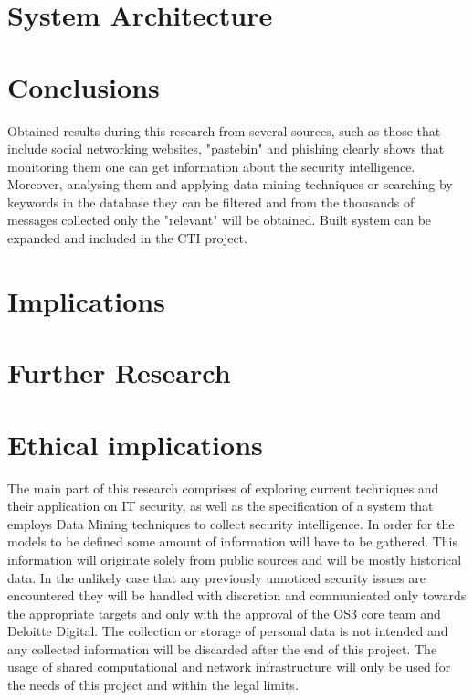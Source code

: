 \documentclass[12pt]{article}
\begin{document}
\newpage
\section{System Architecture}
\newpage
\section*{Conclusions}
Obtained results during this research from several sources, such as those that include social networking websites, "pastebin" and phishing clearly shows that monitoring them one can get information about the security intelligence. Moreover, analysing them and applying data mining techniques or searching by keywords in the database they can be filtered and from the thousands of messages collected only the "relevant" will be obtained.  Built system can be expanded and included in the CTI project.
\newpage
\section*{Implications}
\newpage
\section*{Further Research}
\newpage
\section*{Ethical implications}
The main part of this research comprises of exploring current techniques and their application on IT security, as well as the specification of a system that employs Data Mining techniques to collect security intelligence. In order for the models to be defined some amount of information will have to be gathered. This information will originate solely from public sources and will be mostly historical data. In the unlikely case that any previously unnoticed security issues are encountered they will be handled with discretion and communicated only towards the appropriate targets and only with the approval of the OS3 core team and Deloitte Digital. The collection or storage of personal data is not intended and any collected information will be discarded after the end of this project. The usage of shared computational and network infrastructure will only be used for the needs of this project and within the legal limits.
\newpage
\end{document}
